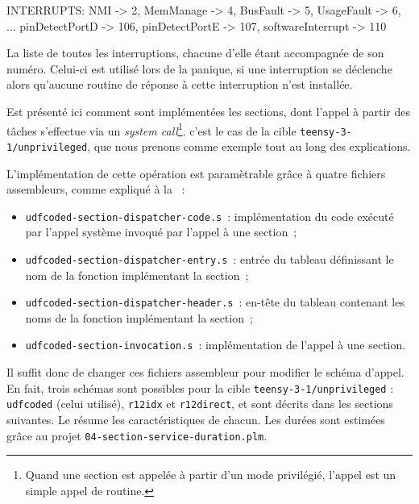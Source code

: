 
\begin{PLM}
INTERRUPTS:
  NMI -> 2,
  MemManage -> 4,
  BusFault -> 5,
  UsageFault -> 6,
  ...
  pinDetectPortD -> 106,
  pinDetectPortE -> 107,
  softwareInterrupt -> 110
\end{PLM}


La liste de toutes les interruptions, chacune d'elle étant accompagnée de son numéro. Celui-ci est utilisé lors de la panique, si une interruption se déclenche alors qu'aucune routine de réponse à cette interruption n'est installée.







Est présenté ici comment sont implémentées les sections, dont l'appel à partir des tâches s'effectue via un \emph{system call}\footnote{Quand une section est appelée à partir d'un mode privilégié, l'appel est un simple appel de routine.}. c'est le cas de la cible \texttt{teensy-3-1/unprivileged}, que nous prenons comme exemple tout au long des explications.

L'implémentation de cette opération est paramètrable grâce à quatre fichiers assembleurs, comme expliqué à la ~:
\begin{itemize}
  \item \texttt{udfcoded-section-dispatcher-code.s}~: implémentation du code exécuté par l'appel système invoqué par l'appel à une section~;
  \item \texttt{udfcoded-section-dispatcher-entry.s}~: entrée du tableau définissant le nom de la fonction implémentant la section~;
  \item \texttt{udfcoded-section-dispatcher-header.s}~: en-tête du tableau contenant les noms de la fonction implémentant la section~;
  \item \texttt{udfcoded-section-invocation.s}~: implémentation de l'appel à une section. 
\end{itemize}

Il suffit donc de changer ces fichiers assembleur pour modifier le schéma d'appel. En fait, trois schémas sont possibles pour la cible \texttt{teensy-3-1/unprivileged} : \texttt{udfcoded} (celui utilisé), \texttt{r12idx} et \texttt{r12direct}, et sont décrits dans les sections suivantes. Le  résume les caractéristiques de chacun. Les durées sont estimées grâce au projet \texttt{04-section-service-duration.plm}. 

